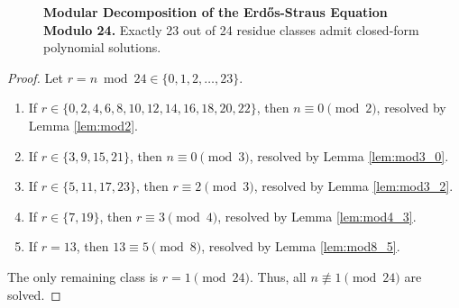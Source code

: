 \documentclass[11pt,a4paper]{article}
\theoremstyle{definition}
\begin{document}
\begin{figure}[htbp]
\centering
{}
\caption{\textbf{Modular Decomposition of the Erd\H{o}s-Straus Equation Modulo 24.} Exactly 23 out of 24 residue classes admit closed-form polynomial solutions.}
\label{fig:modulo_24_wheel}
\end{figure}

\begin{proof}
Let $r = n \bmod 24 \in \{0, 1, 2, \dots, 23\}$.
\begin{enumerate}
    \item If $r \in \{0, 2, 4, 6, 8, 10, 12, 14, 16, 18, 20, 22\}$, then $n \equiv 0 \pmod 2$, resolved by Lemma \ref{lem:mod2}.
    \item If $r \in \{3, 9, 15, 21\}$, then $n \equiv 0 \pmod 3$, resolved by Lemma \ref{lem:mod3_0}.
    \item If $r \in \{5, 11, 17, 23\}$, then $r \equiv 2 \pmod 3$, resolved by Lemma \ref{lem:mod3_2}.
    \item If $r \in \{7, 19\}$, then $r \equiv 3 \pmod 4$, resolved by Lemma \ref{lem:mod4_3}.
    \item If $r = 13$, then $13 \equiv 5 \pmod 8$, resolved by Lemma \ref{lem:mod8_5}.
\end{enumerate}
The only remaining class is $r = 1 \pmod{24}$. Thus, all $n \not\equiv 1 \pmod{24}$ are solved.
\end{proof}
\end{document}
